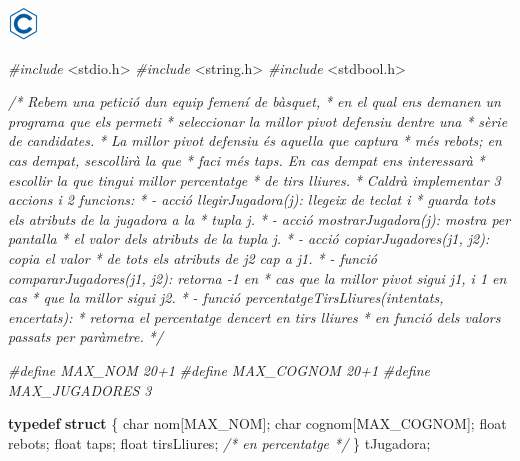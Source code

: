 \documentclass[
]{book}
\newenvironment{Shaded}{\begin{snugshade}}{\end{snugshade}}
\newcommand{\CommentTok}[1]{\textcolor[rgb]{0.56,0.35,0.01}{\textit{#1}}}
\newcommand{\DataTypeTok}[1]{\textcolor[rgb]{0.13,0.29,0.53}{#1}}
\newcommand{\ImportTok}[1]{#1}
\newcommand{\KeywordTok}[1]{\textcolor[rgb]{0.13,0.29,0.53}{\textbf{#1}}}
\newcommand{\NormalTok}[1]{#1}
\newcommand{\PreprocessorTok}[1]{\textcolor[rgb]{0.56,0.35,0.01}{\textit{#1}}}
\begin{document}
\includegraphics{./img/c.png}

\begin{Shaded}
\begin{Highlighting}[]
\PreprocessorTok{\#include }\ImportTok{\textless{}stdio.h\textgreater{}}
\PreprocessorTok{\#include }\ImportTok{\textless{}string.h\textgreater{}}
\PreprocessorTok{\#include }\ImportTok{\textless{}stdbool.h\textgreater{}}

\CommentTok{/* Rebem una petició d\textquotesingle{}un equip femení de bàsquet,}
\CommentTok{ * en el qual ens demanen un programa que els permeti}
\CommentTok{ * seleccionar la millor pivot defensiu d\textquotesingle{}entre una }
\CommentTok{ * sèrie de candidates.}
\CommentTok{ * La millor pivot defensiu és aquella que captura}
\CommentTok{ * més rebots; en cas d\textquotesingle{}empat, s\textquotesingle{}escollirà la que}
\CommentTok{ * faci més taps. En cas d\textquotesingle{}empat ens interessarà}
\CommentTok{ * escollir la que tingui millor percentatge}
\CommentTok{ * de tirs lliures.}
\CommentTok{ * Caldrà implementar 3 accions i 2 funcions:}
\CommentTok{ * {-} acció llegirJugadora(j): llegeix de teclat i}
\CommentTok{ *   guarda tots els atributs de la jugadora a la}
\CommentTok{ *   tupla j.}
\CommentTok{ * {-} acció mostrarJugadora(j): mostra per pantalla}
\CommentTok{ *   el valor dels atributs de la tupla j.}
\CommentTok{ * {-} acció copiarJugadores(j1, j2): copia el valor}
\CommentTok{ *   de tots els atributs de j2 cap a j1.}
\CommentTok{ * {-} funció compararJugadores(j1, j2): retorna {-}1 en }
\CommentTok{ *   cas que la millor pivot sigui j1, i 1 en cas }
\CommentTok{ *   que la millor sigui j2.}
\CommentTok{ * {-} funció percentatgeTirsLliures(intentats, encertats):}
\CommentTok{ *   retorna el percentatge d\textquotesingle{}encert en tirs lliures }
\CommentTok{ *   en funció dels valors passats per paràmetre.}
\CommentTok{ */}
 
\PreprocessorTok{\#define MAX\_NOM 20+1}
\PreprocessorTok{\#define MAX\_COGNOM 20+1}
\PreprocessorTok{\#define MAX\_JUGADORES 3}

\KeywordTok{typedef} \KeywordTok{struct}\NormalTok{ \{}
    \DataTypeTok{char}\NormalTok{ nom[MAX\_NOM];}
    \DataTypeTok{char}\NormalTok{ cognom[MAX\_COGNOM];}
    \DataTypeTok{float}\NormalTok{ rebots;}
    \DataTypeTok{float}\NormalTok{ taps;}
    \DataTypeTok{float}\NormalTok{ tirsLliures; }\CommentTok{/* en percentatge */}
\NormalTok{\} tJugadora;}


\end{Highlighting}
\end{Shaded}
\end{document}
